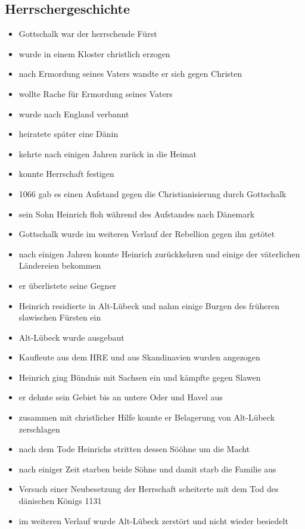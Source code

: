 \documentclass[10pt,a4paper,oneside,ngerman,numbers=noenddot]{scrartcl}
\newenvironment{myitemize}{\begin{itemize}\itemsep -2pt}{\end{itemize}} %
\begin{document}
\subsection*{Herrschergeschichte}

\begin{myitemize}
    \item Gottschalk war der herrschende Fürst
    \item wurde in einem Kloster christlich erzogen
    \item nach Ermordung seines Vaters wandte er sich gegen Christen
    \item wollte Rache für Ermordung seines Vaters
    \item wurde nach England verbannt
    \item heiratete später eine Dänin
    \item kehrte nach einigen Jahren zurück in die Heimat
    \item konnte Herrschaft festigen
    \item 1066 gab es einen Aufstand gegen die Christianisierung durch Gottschalk
    \item sein Sohn Heinrich floh während des Aufstandes nach Dänemark
    \item Gottschalk wurde im weiteren Verlauf der Rebellion gegen ihn getötet
    \item nach einigen Jahren konnte Heinrich zurückkehren und einige der väterlichen Ländereien bekommen
    \item er überlistete seine Gegner
    \item Heinrich residierte in Alt-Lübeck und nahm einige Burgen des früheren slawischen Fürsten ein
    \item Alt-Lübeck wurde ausgebaut
    \item Kaufleute aus dem HRE und aus Skandinavien wurden angezogen
    \item Heinrich ging Bündnis mit Sachsen ein und kämpfte gegen Slawen
    \item er dehnte sein Gebiet bis an untere Oder und Havel aus
    \item zusammen mit christlicher Hilfe konnte er Belagerung von Alt-Lübeck zerschlagen
    \item nach dem Tode Heinrichs stritten dessen Sööhne um die Macht
    \item nach einiger Zeit starben beide Söhne und damit starb die Familie aus
    \item Versuch einer Neubesetzung der Herrschaft scheiterte mit dem Tod des dänischen Königs 1131
    \item im weiteren Verlauf wurde Alt-Lübeck zerstört und nicht wieder besiedelt
\end{myitemize}
\end{document}
